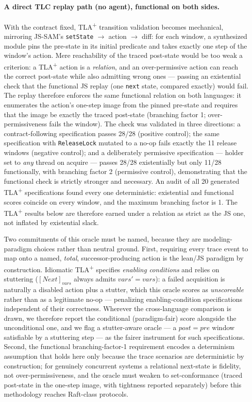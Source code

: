 \documentclass[11pt]{article}
\newcommand{\jssam}{JS-SAM}
\newcommand{\tlaplus}{TLA\texorpdfstring{\textsuperscript{+}}{+}}
\begin{document}
\paragraph{A direct TLC replay path (no agent), functional on both sides.}
With the contract fixed, \tlaplus{} transition validation becomes mechanical,
mirroring \jssam{}'s \texttt{setState} $\to$ action $\to$ diff: for each
window, a synthesized module pins the pre-state in its initial predicate and
takes exactly one step of the window's action. Mere reachability of the
traced post-state would be too weak a criterion: a \tlaplus{} action is a
\emph{relation}, and an over-permissive action can reach the correct
post-state while also admitting wrong ones --- passing an existential check
that the functional JS replay (one \texttt{next} state, compared exactly)
would fail. The replay therefore enforces the same functional relation on
both languages: it enumerates the action's one-step image from the pinned
pre-state and requires that the image be exactly the traced post-state
(branching factor 1; over-permissiveness fails the window). The check was
validated in three directions: a contract-following specification passes
28/28 (positive control); the same specification with \texttt{ReleaseLock}
mutated to a no-op fails exactly the 11 release windows (negative control);
and a deliberately permissive specification --- holder set to \emph{any}
thread on acquire --- passes 28/28 existentially but only 11/28
functionally, with branching factor 2 (permissive control), demonstrating
that the functional check is strictly stronger and necessary. An audit of
all 20 generated \tlaplus{} specifications found every one deterministic:
existential and functional scores coincide on every window, and the maximum
branching factor is 1. The \tlaplus{} results below are therefore earned
under a relation as strict as the JS one, not inflated by existential
slack.

Two commitments of this oracle must be named, because they are
modeling-paradigm choices rather than neutral ground. First, requiring
every trace event to map onto a named, \emph{total}, successor-producing
action is the lean/JS paradigm by construction. Idiomatic \tlaplus{}
specifies \emph{enabling conditions} and relies on stuttering
($[\mathit{Next}]_{\mathit{vars}}$ always admits
$\mathit{vars}' = \mathit{vars}$): a failed acquisition is naturally a
disabled action plus a stutter, which this oracle scores as
\emph{unscoreable} rather than as a legitimate no-op --- penalizing
enabling-condition specifications independent of their correctness.
Wherever the cross-language comparison is drawn, we therefore report the
conditional (paradigm-fair) score alongside the unconditional one, and we
flag a stutter-aware oracle --- a $post = pre$ window satisfiable by a
stuttering step --- as the fairer instrument for such specifications.
Second, the functional branching-factor-1 requirement encodes a
determinism assumption that holds here only because the trace scenarios
are deterministic by construction; for genuinely concurrent systems a
relational next-state is fidelity, not over-permissiveness, and the oracle
must weaken to set-conformance (traced post-state in the one-step image,
with tightness reported separately) before this methodology reaches
Raft-class protocols.
\end{document}
